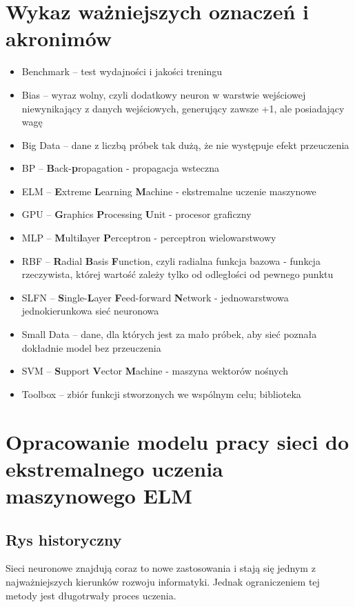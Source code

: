 \documentclass{article}
\begin{document}
\section*{Wykaz ważniejszych oznaczeń i akronimów}
\begin{itemize}[label={},leftmargin=*]
\item Benchmark -- test wydajności i jakości treningu
\item Bias -- wyraz wolny, czyli dodatkowy neuron w warstwie wejściowej niewynikający z danych wejściowych, generujący zawsze +1, ale posiadający wagę
\item Big Data -- dane z liczbą próbek tak dużą, że nie występuje efekt przeuczenia
\item BP -- \textbf{B}ack-\textbf{p}ropagation - propagacja wsteczna
\item ELM -- \textbf{E}xtreme \textbf{L}earning \textbf{M}achine - ekstremalne uczenie maszynowe
\item GPU -- \textbf{G}raphics \textbf{P}rocessing \textbf{U}nit - procesor graficzny
\item MLP -- \textbf{M}ulti\textbf{l}ayer \textbf{P}erceptron - perceptron wielowarstwowy
\item RBF -- \textbf{R}adial \textbf{B}asis \textbf{F}unction, czyli radialna funkcja bazowa - funkcja rzeczywista, której wartość zależy tylko od odległości od pewnego punktu
\item SLFN -- \textbf{S}ingle-\textbf{L}ayer \textbf{F}eed-forward \textbf{N}etwork - jednowarstwowa jednokierunkowa sieć neuronowa
\item Small Data -- dane, dla których jest za mało próbek, aby sieć poznała dokładnie model bez przeuczenia
\item SVM -- \textbf{S}upport \textbf{V}ector \textbf{M}achine - maszyna wektorów nośnych
\item Toolbox -- zbiór funkcji stworzonych we wspólnym celu; biblioteka
\end{itemize}
\clearpage
\section{Opracowanie modelu pracy sieci do ekstremalnego uczenia maszynowego ELM}
\subsection{Rys historyczny}
Sieci neuronowe znajdują coraz to nowe zastosowania i stają się jednym z najważniejszych kierunków rozwoju informatyki. Jednak ograniczeniem tej metody jest długotrwały proces uczenia.
\end{document}
